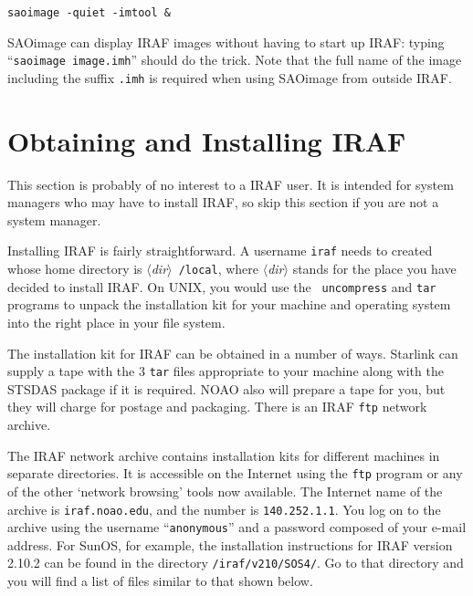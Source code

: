 {\tt saoimage -quiet -imtool \&}

SAOimage can display IRAF images without having to start up
IRAF:  typing ``{\tt saoimage image.imh}'' should do the trick. Note
that the full name of the image including the suffix {\tt .imh} is
required when using SAOimage from outside IRAF.


\section{Obtaining and Installing IRAF}

This section is probably of no interest to a IRAF user.
It is intended for
system managers who may have to install IRAF,
so skip this section if you are not a system manager.

Installing IRAF is fairly straightforward. A username {\tt iraf} needs
to created whose home directory is $\langle${\it dir}$\rangle${\tt
/local}, where $\langle${\it dir}$\rangle$ stands for the place you
have decided to install IRAF. On UNIX, you would use the {\tt
uncompress} and {\tt tar} programs to unpack the installation kit for
your machine and operating system into the right place in your file
system.

The installation kit for IRAF can be obtained in a number of ways.
Starlink can supply a tape with the 3 {\tt tar} files appropriate to your
machine along with the STSDAS package if it is required. NOAO also
will prepare a tape for you, but they will charge for postage and
packaging. There is an IRAF {\tt ftp} network archive.

 The IRAF network archive contains installation kits for different
machines in separate directories. It is accessible on the Internet
using the {\tt ftp} program or any of the other `network browsing' tools now
available. The Internet name of the archive is {\tt iraf.noao.edu},
and the
number is {\tt 140.252.1.1}. You log on to the archive using the username
``{\tt anonymous}'' and a password composed of your e-mail address. For
SunOS, for example, the installation instructions for IRAF version
2.10.2 can be found in the directory {\tt /iraf/v210/SOS4/}. Go to
that directory and you will find a list of files similar to that shown
below.

